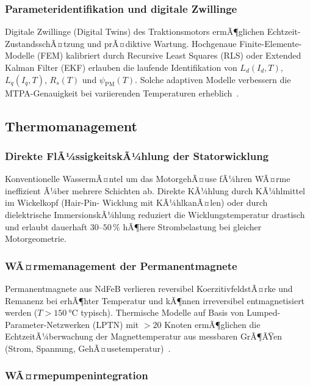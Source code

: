 ﻿\documentclass[a4paper,12pt]{article}
\theoremstyle{definition}
\begin{document}
\subsubsection{Parameteridentifikation und digitale Zwillinge}

Digitale Zwillinge (Digital Twins) des Traktionsmotors ermÃ¶glichen Echtzeit-
ZustandsschÃ¤tzung und prÃ¤diktive Wartung. Hochgenaue Finite-Elemente-Modelle
(FEM) kalibriert durch Recursive Least Squares (RLS) oder Extended Kalman Filter
(EKF) erlauben die laufende Identifikation von $L_d(I_d, T)$, $L_q(I_q, T)$,
$R_s(T)$ und $\psi_{\mathrm{PM}}(T)$. Solche adaptiven Modelle verbessern die
MTPA-Genauigkeit bei variierenden Temperaturen erheblich~\cite{belkhier2021observer}.

\subsection{Thermomanagement}

\subsubsection{Direkte FlÃ¼ssigkeitskÃ¼hlung der Statorwicklung}

Konventionelle WassermÃ¤ntel um das MotorgehÃ¤use fÃ¼hren WÃ¤rme ineffizient Ã¼ber
mehrere Schichten ab. Direkte KÃ¼hlung durch KÃ¼hlmittel im Wickelkopf (Hair-Pin-
Wicklung mit KÃ¼hlkanÃ¤len) oder durch dielektrische ImmersionskÃ¼hlung reduziert
die Wicklungstemperatur drastisch und erlaubt dauerhaft $30$--$50\,\%$ hÃ¶here
Strombelastung bei gleicher Motorgeometrie.

\subsubsection{WÃ¤rmemanagement der Permanentmagnete}

Permanentmagnete aus NdFeB verlieren reversibel KoerzitivfeldstÃ¤rke und
Remanenz bei erhÃ¶hter Temperatur und kÃ¶nnen irreversibel entmagnetisiert werden
($T > \SI{150}{\degreeCelsius}$ typisch). Thermische Modelle auf Basis
von Lumped-Parameter-Netzwerken (LPTN) mit $> 20$ Knoten ermÃ¶glichen die
EchtzeitÃ¼berwachung der Magnettemperatur aus messbaren GrÃ¶ÃŸen (Strom,
Spannung, GehÃ¤usetemperatur)~\cite{nategh2017thermal}.

\subsubsection{WÃ¤rmepumpenintegration}
\end{document}
